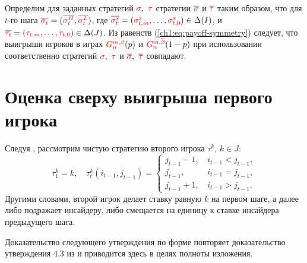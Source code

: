 {\begin{remark}
  \label{ch1:rem:symm-payoffs}
  Определим для заданных стратегий $\sigmar,\ \taur$ стратегии $\symm{\sigmar}$ и $\symm{\taur}$ таким образом, что для $t$-го шага
  $\symm{\sigmas{t}} = (\symm{\sigmas[H]{t}}, \symm{\sigmas[L]{t}})$, где
  $\symm{\sigmas[s]{t}}=(\sigmasc[s][t]{m},\ldots,\sigmasc[s][t]{0}) \in \Delta(I)$, и
  $\symm{\taus{t}} = (\tausc[t]{m},\ldots,\tausc[t]{0}) \in \Delta(J)$.
  Из равенств (\ref{ch1:eq:payoff-symmetry}) следует, что выигрыши игроков в играх $\theG*[\Co]{n}(p)$ и $\theG*[\DCo]{n}(1-p)$ при использовании соответственно стратегий $\sigmar,\ \taur$ и $\symm{\sigmar},\ \symm{\taur}$ совпадают.
\end{remark}

\section{Оценка сверху выигрыша первого игрока}\label{ch1:upper-bound}
Следуя \cite{domansky07}, рассмотрим чистую стратегию второго игрока $\tau^k, \, k \in J$:
\[
  \tau^k_1 = k, \quad \tau^k_t(i_{t-1}, j_{t-1}) = \begin{cases}
    j_{t-1} - 1, & \, i_{t-1} < j_{t-1}, \\
    j_{t-1},     & \, i_{t-1} = j_{t-1}, \\
    j_{t-1} + 1, & \, i_{t-1} > j_{t-1}.
  \end{cases}
\]
Другими словами, второй игрок делает ставку равную $k$ на первом шаге, а далее либо подражает инсайдеру, либо смещается на единицу к ставке инсайдера предыдущего шага.

Доказательство следующего утверждения по форме повторяет доказательство утверждения 4.3 из \cite{domansky07} и приводится здесь в целях полноты изложения.

}

